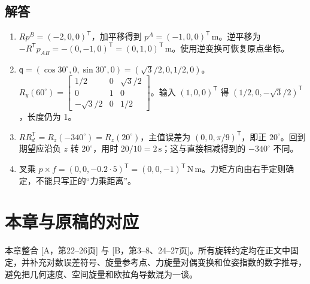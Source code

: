 \subsection*{解答}
\begin{enumerate}
\item $Rp^B=(-2,0,0)^\mathsf T$，加平移得到 $p^A=(-1,0,0)^\mathsf T\,\mathrm m$。逆平移为 $-R^\mathsf Tp_{AB}=-(0,-1,0)^\mathsf T=(0,1,0)^\mathsf T\,\mathrm m$。使用逆变换可恢复原点坐标。
\item $\mathsf q=(\cos30^\circ,0,\sin30^\circ,0)=(\sqrt3/2,0,1/2,0)$。$R_y(60^\circ)=\begin{bmatrix}1/2&0&\sqrt3/2\\0&1&0\\-\sqrt3/2&0&1/2\end{bmatrix}$。输入 $(1,0,0)^\mathsf T$ 得 $(1/2,0,-\sqrt3/2)^\mathsf T$，长度仍为 1。
\item $RR_d^\mathsf T=R_z(-340^\circ)=R_z(20^\circ)$，主值误差为 $(0,0,\pi/9)^\mathsf T$，即正 $20^\circ$。回到期望应沿负 $z$ 转 $20^\circ$，用时 $20/10=2\,\mathrm s$；这与直接相减得到的 $-340^\circ$ 不同。
\item 叉乘 $p\times f=(0,0,-0.2\cdot5)^\mathsf T=(0,0,-1)^\mathsf T\,\mathrm{N\,m}$。力矩方向由右手定则确定，不能只写正的“力乘距离”。
\end{enumerate}

\section*{本章与原稿的对应}
本章整合 [A，第22--26页] 与 [B，第3--8、24--27页]。所有旋转约定均在正文中固定，并补充对数误差符号、旋量参考点、力旋量对偶变换和位姿指数的数字推导，避免把几何速度、空间旋量和欧拉角导数混为一谈。
